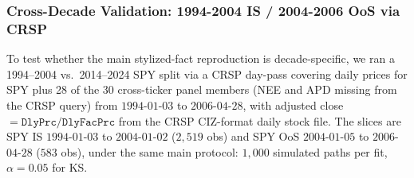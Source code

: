\subsubsection{Cross-Decade Validation: 1994-2004 IS / 2004-2006 OoS via CRSP}
\label{sec:cross_decade_validation}

To test whether the main stylized-fact reproduction is decade-specific, we ran a 1994--2004 vs.\ 2014--2024 SPY split via a CRSP day-pass covering daily prices for SPY plus 28 of the 30 cross-ticker panel members (NEE and APD missing from the CRSP query) from $1994$-$01$-$03$ to $2006$-$04$-$28$, with adjusted close $= \mathtt{DlyPrc} / \mathtt{DlyFacPrc}$ from the CRSP CIZ-format daily stock file. The slices are SPY IS $1994$-$01$-$03$ to $2004$-$01$-$02$ ($2{,}519$ obs) and SPY OoS $2004$-$01$-$05$ to $2006$-$04$-$28$ ($583$ obs), under the same main protocol: $1{,}000$ simulated paths per fit, $\alpha = 0.05$ for KS.

